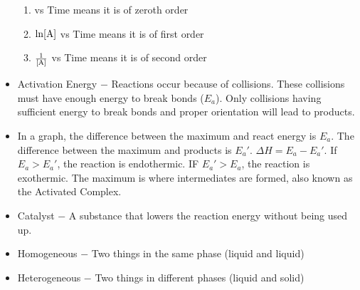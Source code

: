 \documentclass[12pt]{article}
\begin{document}
\begin{itemize}
    \begin{enumerate}

      \item [\ce{A}] vs Time means it is of zeroth order

      \item $\ln[\ce{A}]$ vs Time means it is of first order

      \item $\frac{1}{[\ce{A}]}$ vs Time means it is of second order

    \end{enumerate}

  \item Activation Energy $-$ Reactions occur because of collisions. These collisions must have enough energy to break bonds ($E_a$). Only collisions having sufficient energy to break bonds and proper orientation will lead to products.

  \item In a graph, the difference between the maximum and react energy is $E_a$. The difference between the maximum and products is $E_a'$. $\Delta H = E_a - E_a'$. If $E_a > E_a'$, the reaction is endothermic. IF $E_a' > E_a$, the reaction is exothermic. The maximum is where intermediates are formed, also known as the Activated Complex.

  \item Catalyst $-$ A substance that lowers the reaction energy without being used up.

  \item Homogeneous $-$ Two things in the same phase (liquid and liquid)

  \item Heterogeneous $-$ Two things in different phases (liquid and solid)

\end{itemize}
\end{document}
